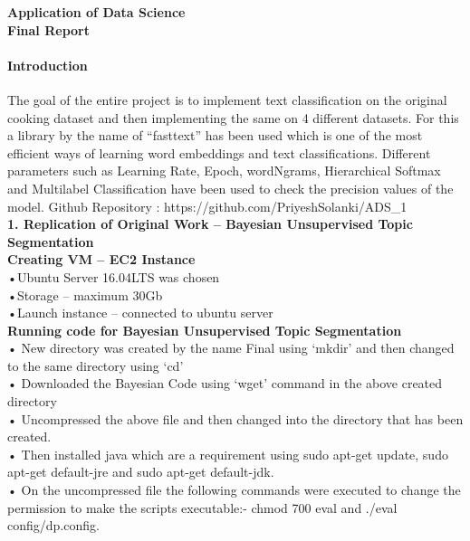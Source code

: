 \documentclass[12pt]{article}
\begin{document}
	\begin{center}
		\large\textbf{Application of Data Science}\\
		\large\textbf{Final Report}
	\end{center}


\paragraph{Introduction}
The goal of the entire project is to implement text classification on the original cooking dataset and then implementing the same on 4 different datasets. For this a library by the name of “fasttext” has been used which is one of the most efficient ways of learning word embeddings and text classifications. Different parameters such as Learning Rate, Epoch, wordNgrams, Hierarchical Softmax and Multilabel Classification have been used to check the precision values of the model.
Github Repository : https://github.com/PriyeshSolanki/ADS\_1
\\


\noindent\textbf{1.	Replication of Original Work – Bayesian Unsupervised Topic Segmentation}\\


\noindent\textbf{Creating VM – EC2 Instance}\\

\noindent •Ubuntu Server 16.04LTS was chosen\\
•Storage – maximum 30Gb\\
•Launch instance – connected to ubuntu server\\

\noindent\textbf{Running code for Bayesian Unsupervised Topic Segmentation}\\

\noindent •	New directory was created by the name Final using ‘mkdir’ and then changed to the same directory using ‘cd’\\
•	Downloaded the Bayesian Code using ‘wget’ command in the above created directory\\
•	Uncompressed the above file and then changed into the directory that has been created.\\
•	Then installed java which are a requirement using sudo apt-get update, sudo apt-get default-jre and sudo apt-get default-jdk.\\
•	On the uncompressed file the following commands were executed to change the permission to make the scripts executable:- chmod 700 eval and ./eval config/dp.config.\\
\end{document}
